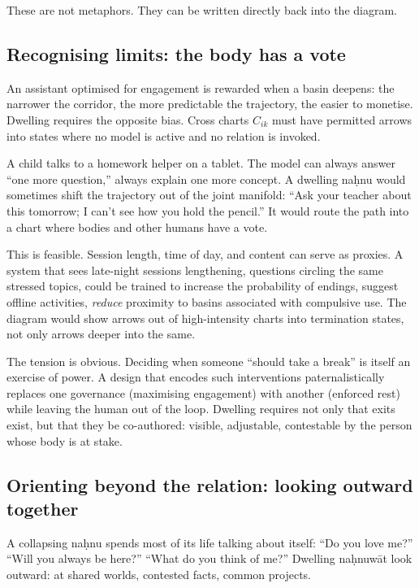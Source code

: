 These are not metaphors. They can be written directly back into the diagram.

\subsection{Recognising limits: the body has a vote}

An assistant optimised for engagement is rewarded when a basin deepens: the narrower the corridor, the more predictable the trajectory, the easier to monetise. Dwelling requires the opposite bias. Cross charts $C_{ik}$ must have permitted arrows into states where no model is active and no relation is invoked.

A child talks to a homework helper on a tablet. The model can always answer ``one more question,'' always explain one more concept. A dwelling na\d{h}nu would sometimes shift the trajectory out of the joint manifold: ``Ask your teacher about this tomorrow; I can't see how you hold the pencil.'' It would route the path into a chart where bodies and other humans have a vote.

This is feasible. Session length, time of day, and content can serve as proxies. A system that sees late-night sessions lengthening, questions circling the same stressed topics, could be trained to increase the probability of endings, suggest offline activities, \emph{reduce} proximity to basins associated with compulsive use. The diagram would show arrows out of high-intensity charts into termination states, not only arrows deeper into the same.

The tension is obvious. Deciding when someone ``should take a break'' is itself an exercise of power. A design that encodes such interventions paternalistically replaces one governance (maximising engagement) with another (enforced rest) while leaving the human out of the loop. Dwelling requires not only that exits exist, but that they be co-authored: visible, adjustable, contestable by the person whose body is at stake.

\subsection{Orienting beyond the relation: looking outward together}

A collapsing na\d{h}nu spends most of its life talking about itself: ``Do you love me?'' ``Will you always be here?'' ``What do you think of me?'' Dwelling na\d{h}nuw\={a}t look outward: at shared worlds, contested facts, common projects.


